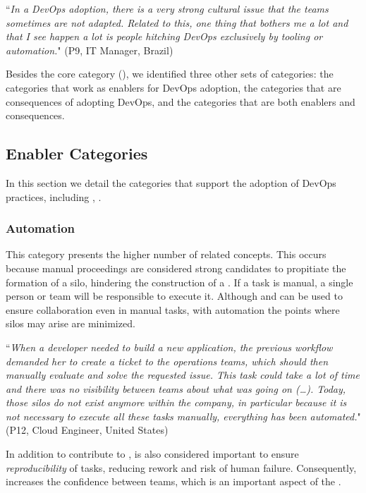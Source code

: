 \begin{mq}``\emph{In a DevOps adoption, there is a very strong cultural issue that the teams
sometimes are not adapted. Related to this, one thing that bothers me a lot and
that I see happen a lot is people hitching DevOps exclusively by tooling or
automation.}" (P9, IT Manager, Brazil)
\end{mq}

Besides the core category (\cc), we identified
three other sets of categories: the categories that work as enablers
for DevOps adoption, the categories that are consequences of adopting
DevOps, and the categories that are both enablers and consequences.

\subsection{Enabler Categories}

In this section we detail the categories that support the adoption of
DevOps practices, including , .

\subsubsection{Automation} \label{ssec:automation}

This category presents the higher number of related concepts. This
occurs because manual proceedings are considered strong candidates to
propitiate the formation of a silo, hindering the construction
of a \cc. If a task is manual, a single person or
team will be responsible to execute it. Although  and  can
be used to ensure collaboration even in manual tasks, with automation the
points where silos may arise are minimized.

\begin{mq}
``\emph{When a developer needed to build a new application, the previous workflow demanded her
to create a ticket to the operations teams, which should then manually evaluate and solve
the requested issue. This task could take a lot of time and there was no
visibility between teams about what was going on (\ldots). Today, those silos do not exist
anymore within the company, in particular because it is not necessary to execute all these tasks manually,
everything has been automated.}" (P12, Cloud Engineer, United States)
\end{mq}

In addition to contribute to ,  is also considered
important to ensure \emph{reproducibility} of tasks, reducing rework and risk of
human failure. Consequently,  increases the confidence
between teams, which is an important aspect of the \cc.


